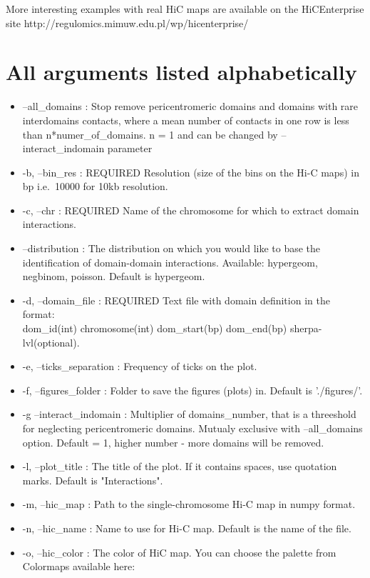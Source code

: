 More interesting examples with real HiC maps are available on the HiCEnterprise site http://regulomics.mimuw.edu.pl/wp/hicenterprise/

\section{All arguments listed alphabetically}
\label{sec:arguments2}
\begin{itemize}
   \item --all\_domains : Stop remove pericentromeric domains and domains with rare interdomains contacts, where a mean
    number of contacts in one row is less than n*numer\_of\_domains. n = 1 and can be changed by --interact\_indomain parameter
    \item -b, --bin\_res : REQUIRED Resolution (size of the bins on the Hi-C maps) in bp i.e.~10000 for 10kb resolution.
    \item -c, --chr : REQUIRED Name of the chromosome for which to extract domain interactions.
    \item --distribution : The distribution on which you would like to base the identification of domain-domain
    interactions. Available: hypergeom, negbinom, poisson. Default is hypergeom.
    \item -d, --domain\_file : REQUIRED Text file with domain definition in the format: \\
    dom\_id(int) chromosome(int) dom\_start(bp) dom\_end(bp) sherpa-lvl(optional).
    \item -e, --ticks\_separation : Frequency of ticks on the plot.
    \item -f, --figures\_folder : Folder to save the figures (plots) in. Default is './figures/'.
     \item  -g --interact\_indomain : Multiplier of domains\_number, that is a threeshold for neglecting pericentromeric domains. 
    Mutualy exclusive with --all\_domains option. Default = 1, higher number - more domains will be removed.
    \item -l, --plot\_title : The title of the plot. If it contains spaces, use quotation marks. Default is
    "Interactions".
    \item -m, --hic\_map : Path to the single-chromosome Hi-C map in numpy format.
    \item -n, --hic\_name : Name to use for Hi-C map. Default is the name of the file.
    \item -o, --hic\_color : The color of HiC map. You can choose the palette from Colormaps available here:

\end{itemize}
